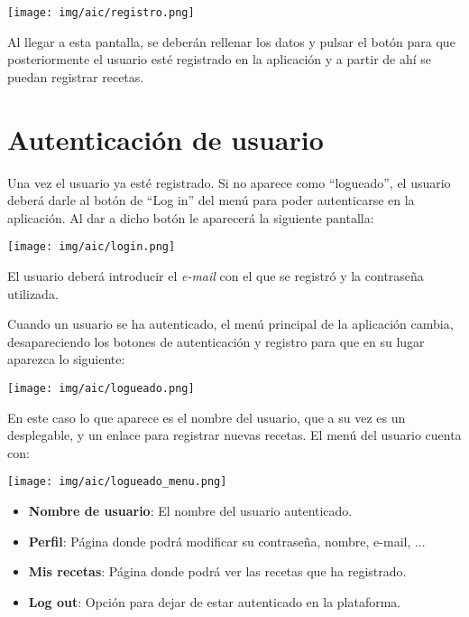 \documentclass{\ClassPath/viu-tfm-template}
\begin{document}
\begin{center}
    \vspace{-10pt}
    \texttt{[image: img/aic/registro.png]}
    \vspace{-20pt}
\end{center}

Al llegar a esta pantalla, se deberán rellenar los datos y pulsar el botón para que posteriormente el usuario esté registrado en la aplicación y a partir de ahí se puedan registrar recetas.


\section{Autenticación de usuario}
Una vez el usuario ya esté registrado. Si no aparece como “logueado”, el usuario deberá darle al botón de “Log in” del menú para poder autenticarse en la aplicación. Al dar a dicho botón le aparecerá la siguiente pantalla:

\begin{center}
    \vspace{-10pt}
    \texttt{[image: img/aic/login.png]}
    \vspace{-20pt}
\end{center}

El usuario deberá introducir el \textit{e-mail} con el que se registró y la contraseña utilizada.

Cuando un usuario se ha autenticado, el menú principal de la aplicación cambia, desapareciendo los botones de autenticación y registro para que en su lugar aparezca lo siguiente:


\begin{center}
    \vspace{-10pt}
    \texttt{[image: img/aic/logueado.png]}
    \vspace{-20pt}
\end{center}

En este caso lo que aparece es el nombre del usuario, que a su vez es un desplegable, y un enlace para registrar nuevas recetas. El menú del usuario cuenta con:


\begin{multicols}{2}
    \begin{center}
        \vspace{-10pt}
        \texttt{[image: img/aic/logueado\_menu.png]}
        \vspace{-20pt}
    \end{center}

   \begin{itemize}
       \item \textbf{Nombre de usuario}: El nombre del usuario autenticado.
       \item \textbf{Perfil}: Página donde podrá modificar su contraseña, nombre, e-mail, ...
       \item \textbf{Mis recetas}: Página donde podrá ver las recetas que ha registrado.
       \item \textbf{Log out}: Opción para dejar de estar autenticado en la plataforma.
   \end{itemize}
\end{multicols}
\end{document}
